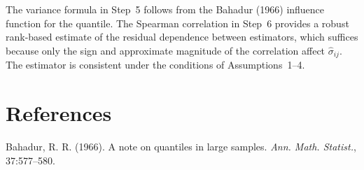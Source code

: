 \documentclass[11pt]{article}
\begin{document}
The variance formula in Step~5 follows from the Bahadur (1966) influence function for the quantile.  The Spearman correlation in Step~6 provides a robust rank-based estimate of the residual dependence between estimators, which suffices because only the sign and approximate magnitude of the correlation affect $\hat\sigma_{ij}$.  The estimator is consistent under the conditions of Assumptions~1--4.

\section*{References}

Bahadur, R. R. (1966). A note on quantiles in large samples. \textit{Ann. Math. Statist.}, 37:577--580.
\end{document}
